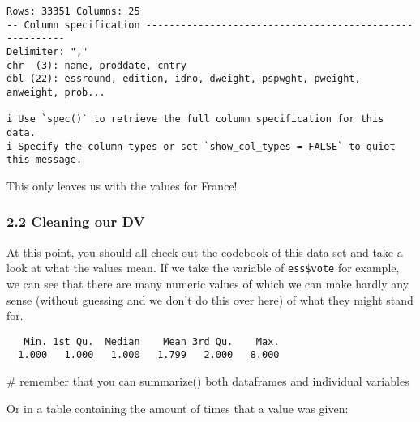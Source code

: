\documentclass[
  letterpaper,
  DIV=11,
  numbers=noendperiod]{scrreprt}
\newenvironment{Shaded}{\begin{snugshade}}{\end{snugshade}}
\newcommand{\CommentTok}[1]{\textcolor[rgb]{0.37,0.37,0.37}{#1}}
\newcommand{\FunctionTok}[1]{\textcolor[rgb]{0.28,0.35,0.67}{#1}}
\newcommand{\NormalTok}[1]{\textcolor[rgb]{0.00,0.23,0.31}{#1}}
\newcommand{\SpecialCharTok}[1]{\textcolor[rgb]{0.37,0.37,0.37}{#1}}
\begin{document}
\begin{verbatim}
Rows: 33351 Columns: 25
-- Column specification --------------------------------------------------------
Delimiter: ","
chr  (3): name, proddate, cntry
dbl (22): essround, edition, idno, dweight, pspwght, pweight, anweight, prob...

i Use `spec()` to retrieve the full column specification for this data.
i Specify the column types or set `show_col_types = FALSE` to quiet this message.
\end{verbatim}

This only leaves us with the values for France!

\hypertarget{cleaning-our-dv}{%
\subsubsection{2.2 Cleaning our DV}\label{cleaning-our-dv}}

At this point, you should all check out the codebook of this data set
and take a look at what the values mean. If we take the variable of
\texttt{ess\$vote} for example, we can see that there are many numeric
values of which we can make hardly any sense (without guessing and we
don't do this over here) of what they might stand for.

\begin{Shaded}
\end{Shaded}

\begin{verbatim}
   Min. 1st Qu.  Median    Mean 3rd Qu.    Max. 
  1.000   1.000   1.000   1.799   2.000   8.000 
\end{verbatim}

\begin{Shaded}
\begin{Highlighting}[]
\CommentTok{\# remember that you can summarize() both dataframes and individual variables}
\end{Highlighting}
\end{Shaded}

Or in a table containing the amount of times that a value was given:

\begin{Shaded}
\end{Shaded}
\end{document}
